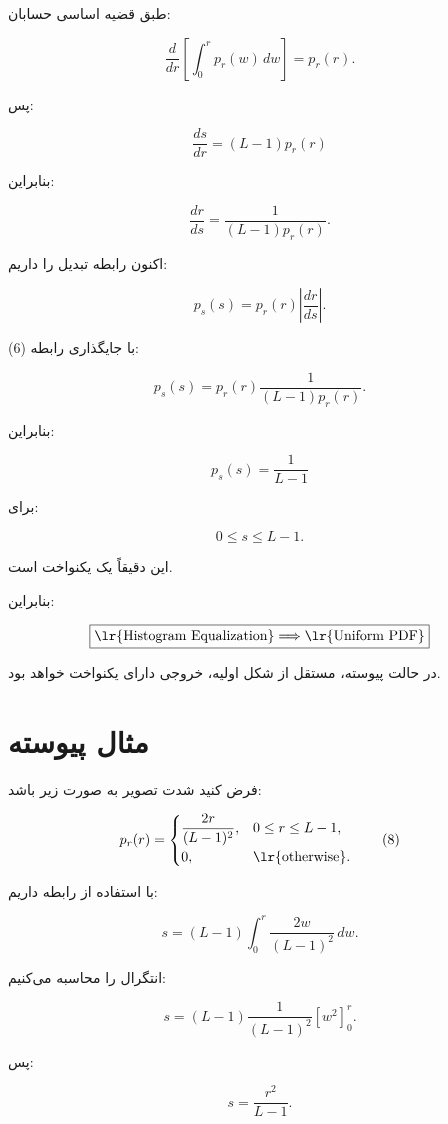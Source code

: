 \documentclass[12pt,a4paper]{article}
\begin{document}
	طبق قضیه اساسی حسابان:
	
	\[
	\frac{d}{dr}
	\left[
	\int_0^r p_r(w)\,dw
	\right]
	=
	p_r(r).
	\]
	
	پس:
	
	\[
	\boxed{
		\frac{ds}{dr}
		=
		(L-1)p_r(r)
	}
	\tag{5}
	\]
	
	بنابراین:
	
	\[
	\frac{dr}{ds}
	=
	\frac{1}{(L-1)p_r(r)}.
	\tag{6}
	\]
	
	اکنون رابطه تبدیل  را داریم:
	
	\[
	p_s(s)
	=
	p_r(r)
	\left|
	\frac{dr}{ds}
	\right|.
	\]
	
	با جایگذاری رابطه (6):
	
	\[
	p_s(s)
	=
	p_r(r)
	\frac{1}{(L-1)p_r(r)}.
	\]
	
	بنابراین:
	
	\[
	\boxed{
		p_s(s)=\frac{1}{L-1}
	}
	\tag{7}
	\]
	
	برای:
	
	\[
	0\le s\le L-1.
	\]
	
	این دقیقاً یک  یکنواخت است.
	
	بنابراین:
	
	\[
	\boxed{
		\text{\lr{Histogram Equalization}}
		\Longrightarrow
		\text{\lr{Uniform PDF}}
	}
	\]
	
	در حالت پیوسته، مستقل از شکل  اولیه، خروجی دارای  یکنواخت
	خواهد بود.
	
	
	\section{مثال پیوسته}
	
	فرض کنید  شدت تصویر به صورت زیر باشد:
	
	\[
	p_r(r)=
	\begin{cases}
		\dfrac{2r}{(L-1)^2},
		&
		0\le r\le L-1,
		\\[6pt]
		0,
		&
		\text{\lr{otherwise}}.
	\end{cases}
	\tag{8}
	\]
	
	با استفاده از رابطه  داریم:
	
	\[
	s
	=
	(L-1)
	\int_0^r
	\frac{2w}{(L-1)^2}
	\,dw.
	\]
	
	انتگرال را محاسبه می‌کنیم:
	
	\[
	s
	=
	(L-1)
	\frac{1}{(L-1)^2}
	\left[w^2\right]_0^r.
	\]
	
	پس:
	
	\[
	s
	=
	\frac{r^2}{L-1}.
	\]
	
\end{document}

